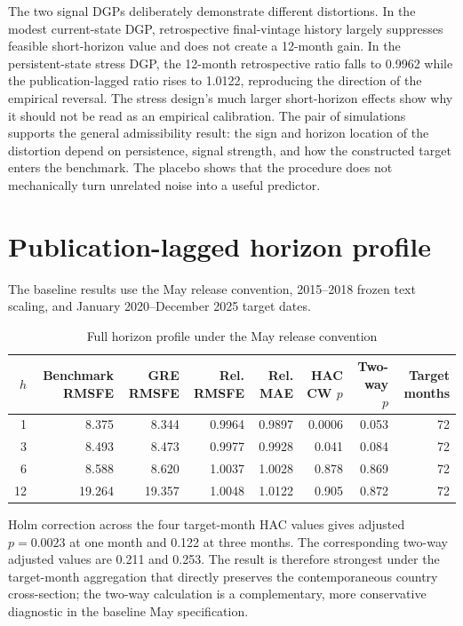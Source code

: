\documentclass[12pt]{article}
\begin{document}
The two signal DGPs deliberately demonstrate different distortions. In the modest current-state DGP, retrospective final-vintage history largely suppresses feasible short-horizon value and does not create a 12-month gain. In the persistent-state stress DGP, the 12-month retrospective ratio falls to 0.9962 while the publication-lagged ratio rises to 1.0122, reproducing the direction of the empirical reversal. The stress design's much larger short-horizon effects show why it should not be read as an empirical calibration. The pair of simulations supports the general admissibility result: the sign and horizon location of the distortion depend on persistence, signal strength, and how the constructed target enters the benchmark. The placebo shows that the procedure does not mechanically turn unrelated noise into a useful predictor.

\section{Publication-lagged horizon profile}
The baseline results use the May release convention, 2015--2018 frozen text scaling, and January 2020--December 2025 target dates.
\begin{table}[htbp]
\centering\scriptsize
\caption{Full horizon profile under the May release convention}
\begin{tabular}{rrrrrrrr}
\toprule
$h$ & Benchmark RMSFE & GRE RMSFE & Rel. RMSFE & Rel. MAE & HAC CW $p$ & Two-way $p$ & Target months\\
\midrule
1 & 8.375 & 8.344 & 0.9964 & 0.9897 & 0.0006 & 0.053 & 72\\
3 & 8.493 & 8.473 & 0.9977 & 0.9928 & 0.041 & 0.084 & 72\\
6 & 8.588 & 8.620 & 1.0037 & 1.0028 & 0.878 & 0.869 & 72\\
12 & 19.264 & 19.357 & 1.0048 & 1.0122 & 0.905 & 0.872 & 72\\
\bottomrule
\end{tabular}
\end{table}

Holm correction across the four target-month HAC values gives adjusted $p=0.0023$ at one month and 0.122 at three months. The corresponding two-way adjusted values are 0.211 and 0.253. The result is therefore strongest under the target-month aggregation that directly preserves the contemporaneous country cross-section; the two-way calculation is a complementary, more conservative diagnostic in the baseline May specification.
\end{document}
